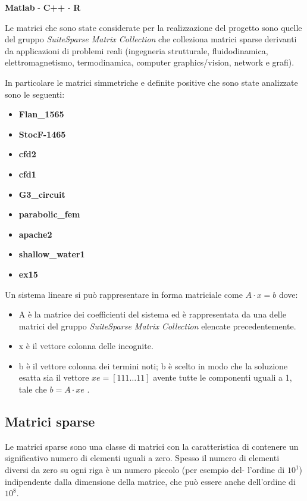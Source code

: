 \documentclass[preprint,12pt]{elsarticle}
\begin{document}
\begin{center}
	\textbf{Matlab} \quad - \quad \textbf{C++} \quad - \quad \textbf{R}
\end{center}

Le matrici che sono state considerate per la realizzazione del progetto sono quelle del gruppo \textit{SuiteSparse Matrix Collection} che colleziona matrici sparse derivanti da applicazioni di problemi reali (ingegneria strutturale, fluidodinamica, elettromagnetismo, termodinamica, computer graphics/vision, network e grafi).

In particolare le matrici simmetriche e definite positive che sono state analizzate sono le seguenti:
\begin{center}
	\begin{itemize}
		\item \textbf{Flan\_1565}
		\item \textbf{StocF-1465}
		\item \textbf{cfd2}
		\item \textbf{cfd1}
		\item \textbf{G3\_circuit}
		\item \textbf{parabolic\_fem}
		\item \textbf{apache2}
		\item \textbf{shallow\_water1}
		\item \textbf{ex15}
	\end{itemize}
	
\end{center}

Un sistema lineare si può rappresentare in forma matriciale come $ A \cdot x = b $
dove:
\begin{itemize}
	\item A è la matrice dei coefficienti del sistema ed è rappresentata da una delle matrici del gruppo \textit{SuiteSparse Matrix Collection} elencate precedentemente.
	\item x è il vettore colonna delle incognite.
	\item b è il vettore colonna dei termini noti; b è scelto in modo che la soluzione esatta sia il vettore $ xe = [1 1 1 \dots 1 1] $ avente tutte le componenti uguali a 1, tale che $ b = A \cdot xe $ .
\end{itemize}


\subsection*{Matrici sparse}
Le matrici sparse sono una classe di matrici con la caratteristica di contenere un significativo numero di elementi uguali a zero. Spesso il numero di elementi diversi da zero su ogni riga è un numero piccolo (per esempio del- l’ordine di $10^1$) indipendente dalla dimensione della matrice, che può essere anche dell’ordine di $10^8$.
\end{document}

